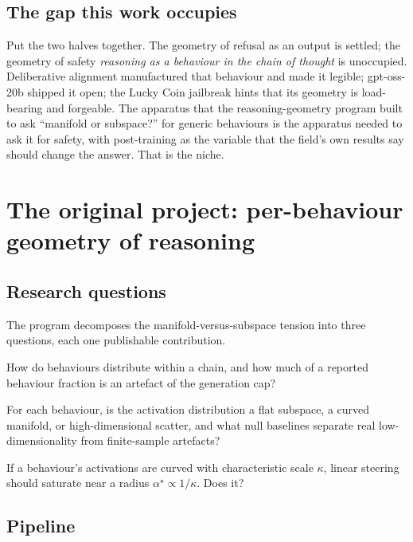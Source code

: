 \documentclass[10pt]{article}
\begin{document}
\subsection{The gap this work occupies}

Put the two halves together. The geometry of refusal as an output is settled; the
geometry of safety \emph{reasoning as a behaviour in the chain of thought} is
unoccupied. Deliberative alignment manufactured that behaviour and made it legible;
gpt-oss-20b shipped it open; the Lucky Coin jailbreak hints that its geometry is
load-bearing and forgeable. The apparatus that the reasoning-geometry program built
to ask ``manifold or subspace?'' for generic behaviours is the apparatus needed to
ask it for safety, with post-training as the variable that the field's own results
say should change the answer. That is the niche.

\section{The original project: per-behaviour geometry of reasoning}
\label{sec:original}

\subsection{Research questions}

The program decomposes the manifold-versus-subspace tension into three questions,
each one publishable contribution.
\begin{description}[leftmargin=1.4em,itemsep=2pt,topsep=2pt]
\item[Q1 (Temporal).] How do behaviours distribute within a chain, and how much of
a reported behaviour fraction is an artefact of the generation cap?
\item[Q2 (Geometric).] For each behaviour, is the activation distribution a flat
subspace, a curved manifold, or high-dimensional scatter, and what null baselines
separate real low-dimensionality from finite-sample artefacts?
\item[Q3 (Causal).] If a behaviour's activations are curved with characteristic
scale $\kappa$, linear steering should saturate near a radius $\alpha^\star \propto
1/\kappa$. Does it?
\end{description}

\subsection{Pipeline}
\end{document}
